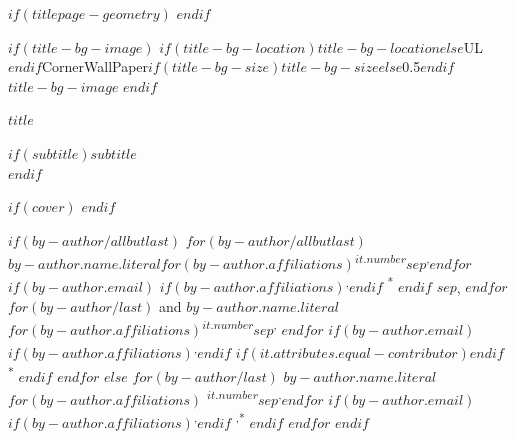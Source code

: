 
$if(titlepage-geometry)$
$endif$
\begin{minipage}[b][\textheight][s]{\textwidth}


\raggedright



$if(title-bg-image)$
\This$if(title-bg-location)$$title-bg-location$$else$UL$endif$CornerWallPaper{$if(title-bg-size)$$title-bg-size$$else$0.5$endif$}{$title-bg-image$}
$endif$


{\huge\bfseries\nohyphens{$title$}\par}%


$if(subtitle)${\large{$subtitle$}}\\[2\baselineskip]$endif$

\vspace{5\baselineskip}


$if(cover)$
$endif$

\raggedright

\vspace{5\baselineskip}

$if(by-author/allbutlast)$
$for(by-author/allbutlast)$
{\large{$by-author.name.literal$}}$for(by-author.affiliations)${\textsuperscript{$it.number$}}$sep$\textsuperscript{,}$endfor$%
$if(by-author.email)$%
$if(by-author.affiliations)$\textsuperscript{,}$endif$%
{\textsuperscript{*}}%
$endif$%
$sep$,
$endfor$
$for(by-author/last)$%
{ and \large{$by-author.name.literal$}}%
$for(by-author.affiliations)${\textsuperscript{$it.number$}}$sep$\textsuperscript{,}%
$endfor$%
$if(by-author.email)$%
$if(by-author.affiliations)$\textsuperscript{,}$endif$%
$if(it.attributes.equal-contributor)$\Yinyang$endif$
{\textsuperscript{*}}%
$endif$%
$endfor$
$else$
$for(by-author/last)$%
{\large{$by-author.name.literal$}}%
$for(by-author.affiliations)$%
{\textsuperscript{$it.number$}}$sep$\textsuperscript{,}$endfor$%
$if(by-author.email)$%
$if(by-author.affiliations)$\textsuperscript{,}$endif$%
{\textsuperscript{,*}}%
$endif$%
$endfor$
$endif$


\end{minipage}
